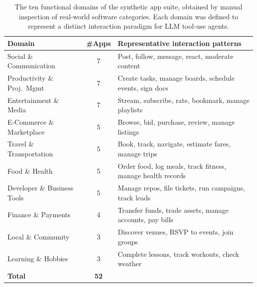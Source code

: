 \documentclass[11pt]{article}
\begin{document}
\begin{table}[h]
\centering
\small
\caption{The ten functional domains of the synthetic app suite, obtained by manual inspection of real-world software categories. Each domain was defined to represent a distinct interaction paradigm for LLM tool-use agents.}
\label{tab:domains}
\setlength{\tabcolsep}{6pt}
\begin{tabular}{lcp{8.5cm}}
\toprule
\textbf{Domain} & \textbf{\#Apps} & \textbf{Representative interaction patterns} \\
\midrule
Social \& Communication      & 7 & Post, follow, message, react, moderate content \\
Productivity \& Proj.\ Mgmt  & 7 & Create tasks, manage boards, schedule events, sign docs \\
Entertainment \& Media       & 7 & Stream, subscribe, rate, bookmark, manage playlists \\
E-Commerce \& Marketplace    & 5 & Browse, bid, purchase, review, manage listings \\
Travel \& Transportation     & 5 & Book, track, navigate, estimate fares, manage trips \\
Food \& Health               & 5 & Order food, log meals, track fitness, manage health records \\
Developer \& Business Tools  & 5 & Manage repos, file tickets, run campaigns, track leads \\
Finance \& Payments          & 4 & Transfer funds, trade assets, manage accounts, pay bills \\
Local \& Community           & 3 & Discover venues, RSVP to events, join groups \\
Learning \& Hobbies          & 3 & Complete lessons, track workouts, check weather \\
\midrule
\textbf{Total}               & \textbf{52} & \\
\bottomrule
\end{tabular}
\end{table}
\end{document}
